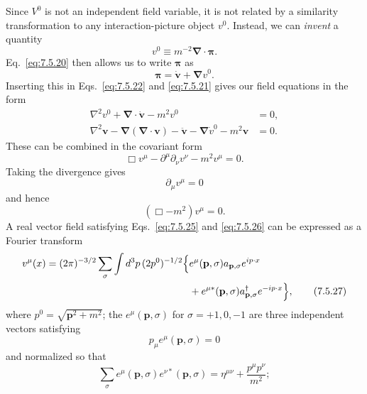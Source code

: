 Since $V^0$ is not an independent field variable, it is not related by a
similarity transformation to any interaction-picture object $v^0$. Instead,
we can \emph{invent} a quantity
\begin{equation}
v^0\equiv m^{-2}\boldsymbol\nabla\cdot\boldsymbol\pi.
\tag{7.5.22}\label{eq:7.5.22}
\end{equation}
Eq.~\eqref{eq:7.5.20} then allows us to write $\boldsymbol\pi$ as
\begin{equation}
\boldsymbol\pi=\dot{\mathbf v}+\boldsymbol\nabla v^0.
\tag{7.5.23}\label{eq:7.5.23}
\end{equation}
Inserting this in Eqs.~\eqref{eq:7.5.22} and \eqref{eq:7.5.21} gives our field equations in the
form
\begin{align*}
\nabla^2v^0+\boldsymbol\nabla\cdot\dot{\mathbf v}-m^2v^0&=0,\\
\nabla^2\mathbf v-\boldsymbol\nabla(\boldsymbol\nabla\cdot\mathbf v)
-\ddot{\mathbf v}-\boldsymbol\nabla\dot v^0-m^2\mathbf v&=0.
\end{align*}
These can be combined in the covariant form
\begin{equation}
\Box v^\mu-\partial^\mu\partial_\nu v^\nu-m^2v^\mu=0.
\tag{7.5.24}\label{eq:7.5.24}
\end{equation}
Taking the divergence gives
\begin{equation}
\partial_\mu v^\mu=0
\tag{7.5.25}\label{eq:7.5.25}
\end{equation}
and hence
\begin{equation}
(\Box-m^2)v^\mu=0.
\tag{7.5.26}\label{eq:7.5.26}
\end{equation}
A real vector field satisfying Eqs.~\eqref{eq:7.5.25} and \eqref{eq:7.5.26} can be expressed as
a Fourier transform
\begin{align}
v^\mu(x)=(2\pi)^{-3/2}\sum_\sigma\int d^3p\,(2p^0)^{-1/2}
\Bigl\{&e^\mu(\mathbf p,\sigma)a_{\mathbf p,\sigma}e^{ip\cdot x}\notag\\
&+e^{\mu*}(\mathbf p,\sigma)a^\dagger_{\mathbf p,\sigma}e^{-ip\cdot x}\Bigr\},
\tag{7.5.27}\label{eq:7.5.27}
\end{align}
where $p^0=\sqrt{\mathbf p^2+m^2}$; the $e^\mu(\mathbf p,\sigma)$ for
$\sigma=+1,0,-1$ are three independent vectors satisfying
\begin{equation}
p_\mu e^\mu(\mathbf p,\sigma)=0
\tag{7.5.28}\label{eq:7.5.28}
\end{equation}
and normalized so that
\begin{equation}
\sum_\sigma e^\mu(\mathbf p,\sigma)e^{\nu*}(\mathbf p,\sigma)
=\eta^{\mu\nu}+\frac{p^\mu p^\nu}{m^2};
\tag{7.5.29}\label{eq:7.5.29}
\end{equation}
